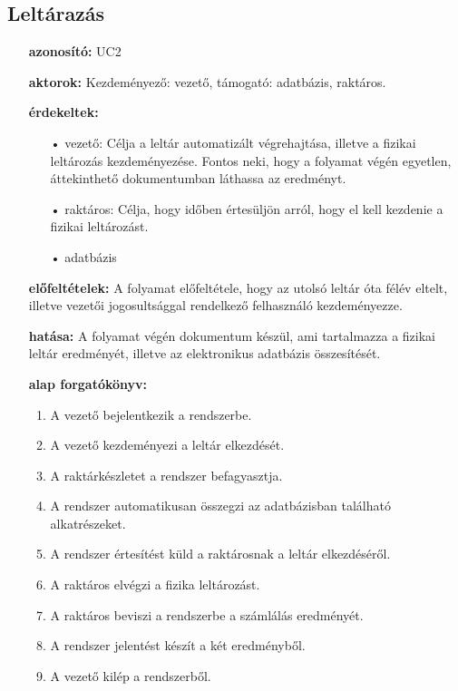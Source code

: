 \documentclass[12pt]{article}\usepackage[left=20mm,right=20mm,top=15mm,bottom=20mm]{geometry}
\begin{document}
\subsection{Leltárazás}
\begin{itemize}
\item[] \textbf{azonosító: } UC2
\item[] \textbf{aktorok: } Kezdeményező: vezető, támogató: adatbázis, raktáros.

\item[] \textbf{érdekeltek: }
\vspace*{-3mm}
\begin{itemize}
\item[•] vezető: Célja a leltár automatizált végrehajtása, illetve a fizikai leltározás kezdeményezése. Fontos neki, hogy a folyamat végén egyetlen, áttekinthető dokumentumban láthassa az eredményt.

\item[•] raktáros: Célja, hogy időben értesüljön arról, hogy el kell kezdenie a fizikai leltározást. 

\item[•] adatbázis
\end{itemize}

\item[] \textbf{előfeltételek: } A folyamat előfeltétele, hogy az utolsó leltár óta félév eltelt, illetve vezetői jogosultsággal rendelkező felhasználó kezdeményezze.

\item[] \textbf{hatása: }
A folyamat végén dokumentum készül, ami tartalmazza a fizikai leltár eredményét, illetve az elektronikus adatbázis összesítését.

\item[] \textbf{alap forgatókönyv: }
\begin{enumerate}
\item A vezető bejelentkezik a rendszerbe.
\item A vezető kezdeményezi a leltár elkezdését.
\item A raktárkészletet a rendszer befagyasztja.
\item A rendszer automatikusan összegzi az adatbázisban található alkatrészeket.
\item A rendszer értesítést küld a raktárosnak a leltár elkezdéséről.
\item A raktáros elvégzi a fizika leltározást.
\item A raktáros beviszi a rendszerbe a számlálás eredményét.
\item A rendszer jelentést készít a két eredményből.
\item A vezető kilép a rendszerből.
\end{enumerate}
\end{itemize} 
\end{document}
